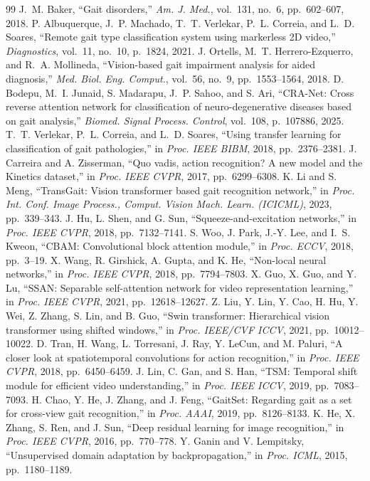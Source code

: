 \documentclass[conference]{IEEEtran}
\begin{document}
\begin{thebibliography}{99}
\footnotesize
{} J.~M. Baker, ``Gait disorders,'' \emph{Am. J. Med.},
vol.~131, no.~6, pp.~602--607, 2018.
 P. Albuquerque, J.~P. Machado, T.~T. Verlekar,
P.~L. Correia, and L.~D. Soares, ``Remote gait type classification system using
markerless 2D video,'' \emph{Diagnostics}, vol.~11, no.~10, p.~1824, 2021.
 J. Ortells, M.~T. Herrero-Ezquerro, and R.~A. Mollineda,
``Vision-based gait impairment analysis for aided diagnosis,'' \emph{Med. Biol.
Eng. Comput.}, vol.~56, no.~9, pp.~1553--1564, 2018.
 D. Bodepu, M.~I. Junaid, S. Madarapu, J.~P. Sahoo, and
S. Ari, ``CRA-Net: Cross reverse attention network for classification of
neuro-degenerative diseases based on gait analysis,'' \emph{Biomed. Signal
Process. Control}, vol.~108, p.~107886, 2025.
 T.~T. Verlekar, P.~L. Correia, and L.~D. Soares,
``Using transfer learning for classification of gait pathologies,'' in
\emph{Proc. IEEE BIBM}, 2018, pp.~2376--2381.
 J. Carreira and A. Zisserman, ``Quo vadis, action
recognition? A new model and the Kinetics dataset,'' in \emph{Proc. IEEE CVPR},
2017, pp.~6299--6308.
 K. Li and S. Meng, ``TransGait: Vision transformer
based gait recognition network,'' in \emph{Proc. Int. Conf. Image Process.,
Comput. Vision Mach. Learn. (ICICML)}, 2023, pp.~339--343.
 J. Hu, L. Shen, and G. Sun, ``Squeeze-and-excitation
networks,'' in \emph{Proc. IEEE CVPR}, 2018, pp.~7132--7141.
 S. Woo, J. Park, J.-Y. Lee, and I.~S. Kweon, ``CBAM:
Convolutional block attention module,'' in \emph{Proc. ECCV}, 2018, pp.~3--19.
 X. Wang, R. Girshick, A. Gupta, and K. He,
``Non-local neural networks,'' in \emph{Proc. IEEE CVPR}, 2018, pp.~7794--7803.
 X. Guo, X. Guo, and Y. Lu, ``SSAN: Separable
self-attention network for video representation learning,'' in \emph{Proc. IEEE
CVPR}, 2021, pp.~12618--12627.
 Z. Liu, Y. Lin, Y. Cao, H. Hu, Y. Wei, Z. Zhang, S. Lin,
and B. Guo, ``Swin transformer: Hierarchical vision transformer using shifted
windows,'' in \emph{Proc. IEEE/CVF ICCV}, 2021, pp.~10012--10022.
 D. Tran, H. Wang, L. Torresani, J. Ray, Y. LeCun, and
M. Paluri, ``A closer look at spatiotemporal convolutions for action
recognition,'' in \emph{Proc. IEEE CVPR}, 2018, pp.~6450--6459.
 J. Lin, C. Gan, and S. Han, ``TSM: Temporal shift module
for efficient video understanding,'' in \emph{Proc. IEEE ICCV}, 2019,
pp.~7083--7093.
 H. Chao, Y. He, J. Zhang, and J. Feng, ``GaitSet:
Regarding gait as a set for cross-view gait recognition,'' in \emph{Proc.
AAAI}, 2019, pp.~8126--8133.
 K. He, X. Zhang, S. Ren, and J. Sun, ``Deep residual
learning for image recognition,'' in \emph{Proc. IEEE CVPR}, 2016, pp.~770--778.
 Y. Ganin and V. Lempitsky, ``Unsupervised domain adaptation
by backpropagation,'' in \emph{Proc. ICML}, 2015, pp.~1180--1189.
\end{thebibliography}
\end{document}
